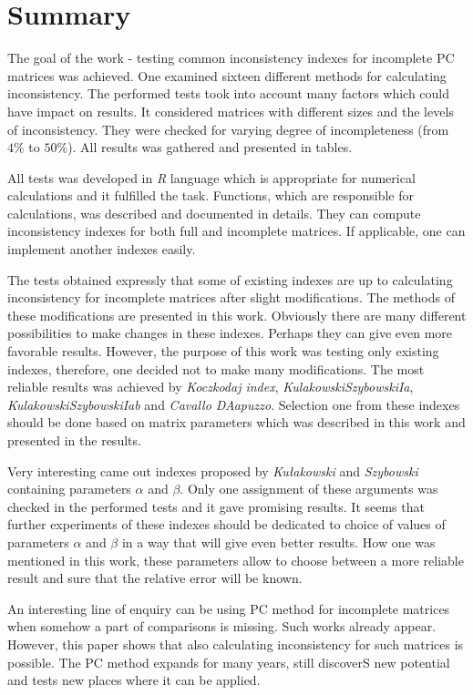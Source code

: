 \chapter{Summary}
\label{sec:summary}

The goal of the work - testing common inconsistency indexes for incomplete PC matrices was achieved. One examined sixteen different methods for calculating inconsistency. The performed tests took into account many factors which could have impact on results. It considered matrices with different sizes and the levels of inconsistency. They were checked for varying degree of incompleteness (from $4\%$ to $50\%$). All results was gathered and presented in tables.

All tests was developed in \textit{R} language which is appropriate for numerical calculations and it fulfilled the task. Functions, which are responsible for calculations, was described and documented in details. They can compute inconsistency indexes for both full and incomplete matrices. If applicable, one can implement another indexes easily.

The tests obtained expressly that some of existing indexes are up to calculating inconsistency for incomplete matrices after slight modifications. The methods of these modifications are presented in this work. Obviously there are many different possibilities to make changes in these indexes. Perhaps they can give even more favorable results. However, the purpose of this work was testing only existing indexes, therefore, one decided not to make many modifications. The most reliable results was achieved by \textit{Koczkodaj index}, \textit{KulakowskiSzybowskiIa}, \textit{KulakowskiSzybowskiIab} and \textit{Cavallo DAapuzzo}. Selection one from these indexes should be done based on matrix parameters which was described in this work and presented in the results.

Very interesting came out indexes proposed by \textit{Kułakowski} and \textit{Szybowski} containing parameters $\alpha$ and $\beta$. Only one assignment of these arguments was checked in the performed tests and it gave promising results. It seems that further experiments of these indexes should be dedicated to choice of values of parameters $\alpha$ and $\beta$ in a way that will give even better results. How one was mentioned in this work, these parameters allow to choose between a more reliable result and sure that the relative error will be known.

An interesting line of enquiry can be using PC method for incomplete matrices when somehow a part of comparisons is missing. Such works already appear. However, this paper shows that also calculating inconsistency for such matrices is possible. The PC method expands for many years, still discoverS new potential and tests new places where it can be applied.
